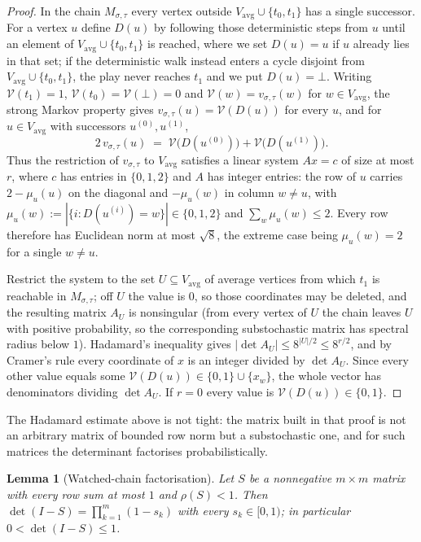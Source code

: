 \documentclass[11pt]{article}
\theoremstyle{plain}
\newtheorem{lemma}[theorem]{Lemma}
\theoremstyle{definition}
\newcommand{\Vavg}{V_{\mathrm{avg}}}
\begin{document}
\begin{proof}
In the chain $M_{\sigma,\tau}$ every vertex outside
$\Vavg\cup\{t_0,t_1\}$ has a single successor. For a vertex $u$ define
$D(u)$ by following those deterministic steps from $u$ until an element
of $\Vavg\cup\{t_0,t_1\}$ is reached, where we set $D(u)=u$ if $u$
already lies in that set; if the deterministic walk instead enters a
cycle disjoint from $\Vavg\cup\{t_0,t_1\}$, the play never reaches $t_1$
and we put $D(u)=\bot$. Writing $\mathcal{V}(t_1)=1$,
$\mathcal{V}(t_0)=\mathcal{V}(\bot)=0$ and
$\mathcal{V}(w)=v_{\sigma,\tau}(w)$ for $w\in\Vavg$, the strong Markov
property gives $v_{\sigma,\tau}(u)=\mathcal{V}(D(u))$ for every $u$, and
for $u\in\Vavg$ with successors $u^{(0)},u^{(1)}$,
\[
  2\,v_{\sigma,\tau}(u)\;=\;\mathcal{V}\bigl(D(u^{(0)})\bigr)+\mathcal{V}\bigl(D(u^{(1)})\bigr).
\]
Thus the restriction of $v_{\sigma,\tau}$ to $\Vavg$ satisfies a linear
system $Ax=c$ of size at most $r$, where $c$ has entries in
$\{0,1,2\}$ and $A$ has integer entries: the row of $u$ carries
$2-\mu_u(u)$ on the diagonal and $-\mu_u(w)$ in column $w\ne u$, with
$\mu_u(w):=|\{i: D(u^{(i)})=w\}|\in\{0,1,2\}$ and
$\sum_{w}\mu_u(w)\le2$. Every row therefore has Euclidean norm at most
$\sqrt{8}$, the extreme case being $\mu_u(w)=2$ for a single $w\ne u$.

Restrict the system to the set $U\subseteq\Vavg$ of average vertices from
which $t_1$ is reachable in $M_{\sigma,\tau}$; off $U$ the value is $0$,
so those coordinates may be deleted, and the resulting matrix $A_U$ is
nonsingular (from every vertex of $U$ the chain leaves $U$ with positive
probability, so the corresponding substochastic matrix has spectral
radius below $1$). Hadamard's inequality gives
$|\det A_U|\le 8^{|U|/2}\le 8^{r/2}$, and by Cramer's rule every
coordinate of $x$ is an integer divided by $\det A_U$. Since every other
value equals some $\mathcal{V}(D(u))\in\{0,1\}\cup\{x_w\}$, the whole
vector has denominators dividing $\det A_U$. If $r=0$ every value is
$\mathcal{V}(D(u))\in\{0,1\}$.
\end{proof}

The Hadamard estimate above is not tight: the matrix built in that proof
is not an arbitrary matrix of bounded row norm but a substochastic one,
and for such matrices the determinant factorises probabilistically.

\begin{lemma}[Watched-chain factorisation]\label{lem:watched}
Let $S$ be a nonnegative $m\times m$ matrix with every row sum at most
$1$ and $\rho(S)<1$. Then $\det(I-S)=\prod_{k=1}^{m}(1-s_k)$ with every
$s_k\in[0,1)$; in particular $0<\det(I-S)\le1$.
\end{lemma}
\end{document}
